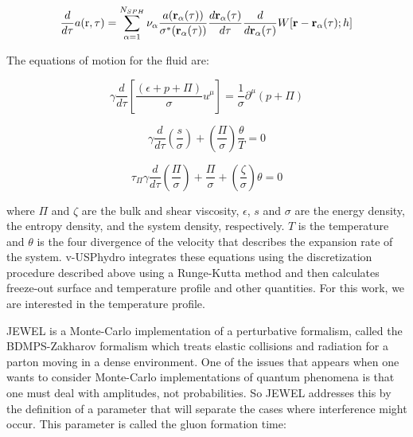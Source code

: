 \begin{equation}
\frac{d}{d \tau} a(\mathbf{\rm r},\tau) = \sum_{\alpha=1}^{N_{SPH}} \nu_{\alpha} \frac{a(\boldsymbol{\rm r}_\alpha (\tau))}{\sigma^*(\boldsymbol{\rm r}_\alpha (\tau))} \frac{d\boldsymbol{\rm r}_\alpha (\tau)}{d \tau} \frac{d}{d\boldsymbol{\rm r}_\alpha (\tau)} W [ \boldsymbol{\rm r} - \boldsymbol{\rm r}_\alpha(\tau);h]
\end{equation}

The equations of motion for the fluid are\cite{denicol_effect_2009,denicol_effect_2010}:

\begin{equation}
\gamma \frac{d}{d\tau} \left[ \frac{(\epsilon + p + \Pi)}{\sigma} u^{\mu} \right] = \frac{1}{\sigma} \partial^{\mu} (p+\Pi)
\end{equation}

\begin{equation}
\gamma \frac{d}{d \tau} \left( \frac{s}{\sigma} \right) + \left( \frac{\Pi}{\sigma} \right) \frac{\theta}{T} = 0
\end{equation}

\begin{equation}
\tau_{\Pi} \gamma \frac{d}{d\tau}\left( \frac{\Pi}{\sigma} \right) + \frac{\Pi}{\sigma} + \left( \frac{\zeta}{\sigma} \right) \theta = 0
\end{equation}

where $\Pi$ and $\zeta$ are the bulk and shear viscosity, $\epsilon$, $s$ and $\sigma$ are the energy density, the entropy density, and the system density, respectively. $T$ is the temperature and $\theta$ is the four divergence of the velocity that describes the expansion rate of the system. v-USPhydro integrates these equations using the discretization procedure described above using a Runge-Kutta method and then calculates freeze-out surface and temperature profile and other quantities. For this work, we are interested in the temperature profile.



JEWEL\cite{zapp_jewel_2014, zapp_monte_2009, zapp_perturbative_2013} is a Monte-Carlo implementation of a perturbative formalism, called the BDMPS-Zakharov formalism which treats elastic collisions and radiation for a parton moving in a dense environment. One of the issues that appears when one wants to consider Monte-Carlo implementations of quantum phenomena is that one must deal with amplitudes, not probabilities. So JEWEL addresses this by the definition of a parameter that will separate the cases where interference might occur. This parameter is called the gluon formation time:

